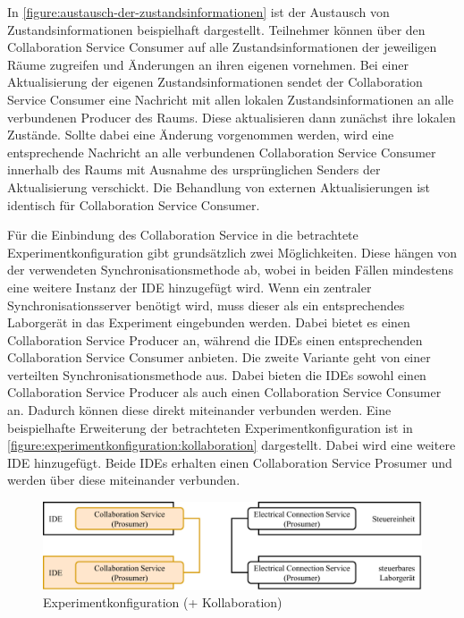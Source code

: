 In \autoref{figure:austausch-der-zustandsinformationen} ist der Austausch von Zustandsinformationen beispielhaft dargestellt. Teilnehmer können über den Collaboration Service Consumer auf alle Zustandsinformationen der jeweiligen Räume zugreifen und Änderungen an ihren eigenen vornehmen. Bei einer Aktualisierung der eigenen Zustandsinformationen sendet der Collaboration Service Consumer eine Nachricht mit allen lokalen Zustandsinformationen an alle verbundenen Producer des Raums. Diese aktualisieren dann zunächst ihre lokalen Zustände. Sollte dabei eine Änderung vorgenommen werden, wird eine entsprechende Nachricht an alle verbundenen Collaboration Service Consumer innerhalb des Raums mit Ausnahme des ursprünglichen Senders der Aktualisierung verschickt. Die Behandlung von externen Aktualisierungen ist identisch für Collaboration Service Consumer.

Für die Einbindung des Collaboration Service in die betrachtete Experimentkonfiguration gibt grundsätzlich zwei Möglichkeiten. Diese hängen von der verwendeten Synchronisationsmethode ab, wobei in beiden Fällen mindestens eine weitere Instanz der IDE hinzugefügt wird. Wenn ein zentraler Synchronisationsserver benötigt wird, muss dieser als ein entsprechendes Laborgerät in das Experiment eingebunden werden. Dabei bietet es einen Collaboration Service Producer an, während die IDEs einen entsprechenden Collaboration Service Consumer anbieten. Die zweite Variante geht von einer verteilten Synchronisationsmethode aus. Dabei bieten die IDEs sowohl einen Collaboration Service Producer als auch einen Collaboration Service Consumer an. Dadurch können diese direkt miteinander verbunden werden. Eine beispielhafte Erweiterung der betrachteten Experimentkonfiguration ist in \autoref{figure:experimentkonfiguration:kollaboration} dargestellt. Dabei wird eine weitere IDE hinzugefügt. Beide IDEs erhalten einen Collaboration Service Prosumer und werden über diese miteinander verbunden.

\begin{figure}[tbp]
    \centering
    \includegraphics[width=\textwidth]{diagrams/experimentkonfigurationen/Experimentkonfiguration-01.drawio.pdf}
    \caption{Experimentkonfiguration (+ Kollaboration)}
    \label{figure:experimentkonfiguration:kollaboration}
\end{figure}